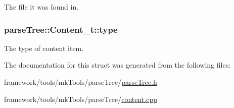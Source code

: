 The file it was found in. 

\subsubsection[{\texorpdfstring{type}{type}}]{ parse\+Tree\+::\+Content\+\_\+t\+::type}\hypertarget{structparse_tree_1_1_content__t_a0f34791b6c4a7ffa174e222bdb73d9ff}{}\label{structparse_tree_1_1_content__t_a0f34791b6c4a7ffa174e222bdb73d9ff}


The type of content item. 



The documentation for this struct was generated from the following files\+:\begin{DoxyCompactItemize}
\item 
framework/tools/mk\+Tools/parse\+Tree/\hyperlink{parse_tree_8h}{parse\+Tree.\+h}\item 
framework/tools/mk\+Tools/parse\+Tree/\hyperlink{content_8cpp}{content.\+cpp}\end{DoxyCompactItemize}
